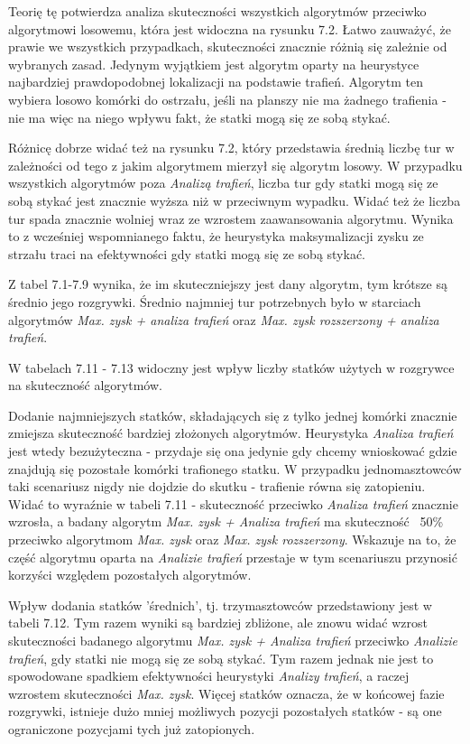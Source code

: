 Teorię tę potwierdza analiza skuteczności wszystkich algorytmów przeciwko algorytmowi losowemu, która jest widoczna na rysunku 7.2. Łatwo zauważyć, że prawie we wszystkich przypadkach, skuteczności  znacznie różnią się zależnie od wybranych zasad. Jedynym wyjątkiem jest algorytm oparty na heurystyce najbardziej prawdopodobnej lokalizacji na podstawie trafień. Algorytm ten wybiera losowo komórki do ostrzału, jeśli na planszy nie ma żadnego trafienia - nie ma więc na niego wpływu fakt, że statki mogą się ze sobą stykać.

Różnicę dobrze widać też na rysunku 7.2, który przedstawia średnią liczbę tur w zależności od tego z jakim algorytmem mierzył się algorytm losowy. W przypadku wszystkich algorytmów poza \emph{Analizą trafień}, liczba tur gdy statki mogą się ze sobą stykać jest znacznie wyższa niż w przeciwnym wypadku. Widać też że liczba tur spada znacznie wolniej wraz ze wzrostem zaawansowania algorytmu. Wynika to z wcześniej wspomnianego faktu, że heurystyka maksymalizacji zysku ze strzału traci na efektywności gdy statki mogą się ze sobą stykać.

Z tabel 7.1-7.9 wynika, że im skuteczniejszy jest dany algorytm, tym krótsze są średnio jego rozgrywki. Średnio najmniej tur potrzebnych było w starciach algorytmów \emph{Max. zysk + analiza trafień} oraz \emph{Max. zysk rozszerzony + analiza trafień}.

W tabelach 7.11 - 7.13 widoczny jest wpływ liczby statków użytych w rozgrywce na skuteczność algorytmów.

Dodanie najmniejszych statków, składających się z tylko jednej komórki znacznie zmiejsza skuteczność bardziej złożonych algorytmów. Heurystyka \emph{Analiza trafień} jest wtedy bezużyteczna - przydaje się ona jedynie gdy chcemy wnioskować gdzie znajdują się pozostałe komórki trafionego statku. W przypadku jednomasztowców taki scenariusz nigdy nie dojdzie do skutku - trafienie równa się zatopieniu. Widać to wyraźnie w tabeli 7.11 - skuteczność przeciwko \emph{Analiza trafień} znacznie wzrosła, a badany algorytm \emph{Max. zysk + Analiza trafień} ma skuteczność ~50\% przeciwko algorytmom \emph{Max. zysk} oraz \emph{Max. zysk rozszerzony}. Wskazuje na to, że część algorytmu oparta na \emph{Analizie trafień} przestaje w tym scenariuszu przynosić korzyści względem pozostałych algorytmów.

Wpływ dodania statków 'średnich', tj. trzymasztowców przedstawiony jest w tabeli 7.12. Tym razem wyniki są bardziej zbliżone, ale znowu widać wzrost skuteczności badanego algorytmu \emph{Max. zysk + Analiza trafień} przeciwko \emph{Analizie trafień}, gdy statki nie mogą się ze sobą stykać. Tym razem jednak nie jest to spowodowane spadkiem efektywności heurystyki \emph{Analizy trafień}, a raczej wzrostem skuteczności \emph{Max. zysk}. Więcej statków oznacza, że w końcowej fazie rozgrywki, istnieje dużo mniej możliwych pozycji pozostałych statków - są one ograniczone pozycjami tych już zatopionych.

